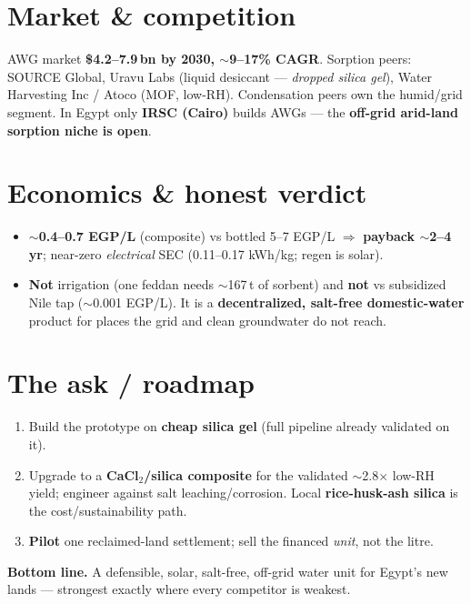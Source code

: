 \documentclass[10pt,a4paper]{article}
\newcommand{\hl}[1]{\textbf{\color{zc}#1}}
\begin{document}
\section{Market \& competition}
AWG market \hl{\$4.2--7.9\,bn by 2030, $\sim$9--17\% CAGR}. Sorption peers: SOURCE Global,
Uravu Labs (liquid desiccant --- \emph{dropped silica gel}), Water Harvesting Inc / Atoco
(MOF, low-RH). Condensation peers own the humid/grid segment. In Egypt only \hl{IRSC (Cairo)}
builds AWGs --- the \hl{off-grid arid-land sorption niche is open}.

\section{Economics \& honest verdict}
\begin{itemize}
  \item \hl{$\sim$0.4--0.7 EGP/L} (composite) vs bottled 5--7 EGP/L $\Rightarrow$ \hl{payback $\sim$2--4 yr};
        near-zero \emph{electrical} SEC (0.11--0.17 kWh/kg; regen is solar).
  \item \textbf{Not} irrigation (one feddan needs $\sim$167\,t of sorbent) and \textbf{not} vs
        subsidized Nile tap ($\sim$0.001 EGP/L). It is a \hl{decentralized, salt-free domestic-water}
        product for places the grid and clean groundwater do not reach.
\end{itemize}

\section{The ask / roadmap}
\begin{enumerate}[leftmargin=1.3em,topsep=1pt,itemsep=1pt]
  \item Build the prototype on \textbf{cheap silica gel} (full pipeline already validated on it).
  \item Upgrade to a \textbf{CaCl$_2$/silica composite} for the validated $\sim$2.8$\times$ low-RH
        yield; engineer against salt leaching/corrosion. Local \textbf{rice-husk-ash silica} is the
        cost/sustainability path.
  \item \textbf{Pilot} one reclaimed-land settlement; sell the financed \emph{unit}, not the litre.
\end{enumerate}

\vspace{2pt}
\begin{tcolorbox}[colback=zclight,colframe=zc,boxrule=0.6pt,arc=2pt,left=6pt,right=6pt,top=3pt,bottom=3pt]
\textbf{Bottom line.} A defensible, solar, salt-free, off-grid water unit for Egypt's new lands
--- strongest exactly where every competitor is weakest.
\end{tcolorbox}
\end{document}
